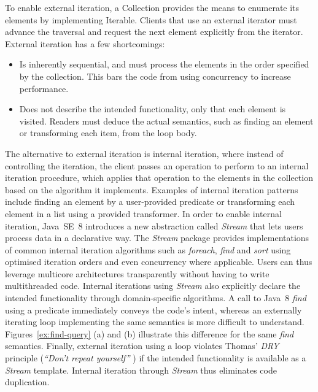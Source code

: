 \documentclass[runningheads,a4paper]{llncs}
\begin{document}
To enable external iteration, a Collection provides the means to enumerate
its elements by implementing Iterable.
Clients that use an external iterator must advance the traversal and
request the next element explicitly from the iterator.  External
iteration has a few shortcomings:
%
\begin{itemize}
%
\item Is inherently sequential, and must process the elements in the order
specified by the collection. This bars the code from using concurrency
to increase performance.
%
\item Does not describe the intended functionality, only that each element
is visited. Readers must deduce the actual semantics, such as finding an element
or transforming each item, from the loop body.
%
\end{itemize}


The alternative to external iteration is internal iteration, where
instead of controlling the iteration, the client passes an operation to
perform to an internal iteration procedure, which applies that
operation to the elements in the collection based on the algorithm it
implements. Examples of internal iteration patterns include finding an
element by a user-provided predicate or transforming each element
in a list using a provided transformer.
%
In order to enable internal iteration, Java~SE~8 introduces a new
abstraction called {\em Stream} that lets users process data in a
declarative way.  The {\em Stream} package provides implementations of
common internal iteration algorithms such as {\em foreach}, {\em find}
and {\em sort} using optimised iteration orders and even concurrency
where applicable.  Users can thus leverage multicore architectures
transparently without having to write multithreaded code.  Internal
iterations using {\em Stream} also explicitly declare the intended
functionality through domain-specific algorithms.  A call to Java~8
{\em find} using a predicate immediately conveys the code's intent,
whereas an externally iterating  loop implementing the same
semantics is more difficult to understand.
Figures~\ref{ex:find-query} (a) and (b) illustrate this
difference for the same {\em find} semantics.  Finally, external
iteration using a  loop violates Thomas' {\em DRY} principle
({\em ``Don't repeat yourself''} \cite{thomas}) if the intended
functionality is available as a {\em Stream} template.  Internal
iteration through {\em Stream} thus eliminates code duplication.
\end{document}
